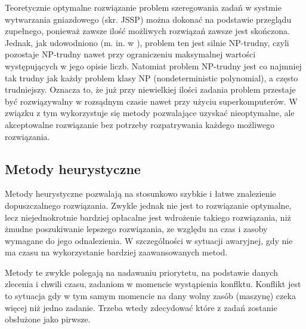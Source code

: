 \documentclass[twoside]{kInzynierka}
\begin{document}
Teoretycznie optymalne rozwiązanie problem szeregowania zadań w systmie wytwarzania gniazdowego (skr. JSSP) można dokonać na podstawie przeglądu zupełnego, ponieważ zawsze ilość możliwych rozwiązań zawsze jest skończona. Jednak, jak udowodniono (m. in. w \cite{np1}\cite{np2}), problem ten jest silnie NP-trudny, czyli pozostaje NP-trudny nawet przy ograniczeniu maksymalnej wartości występujących w jego opisie liczb. Natomiat problem NP-trudny jest co najmniej tak trudny jak każdy problem klasy NP (nondeterministic polynomial), a często trudniejszy. Oznacza to, że już przy niewielkiej ilości zadania problem przestaje być rozwiązywalny w rozsądnym czasie nawet przy użyciu superkomputerów. W związku z tym wykorzystuje się metody pozwalające uzyskać nieoptymalne, ale akceptowalne rozwiązanie bez potrzeby rozpatrywania każdego możliwego rozwiązania. %

\subsection     {Metody heurystyczne}
Metody heurystyczne pozwalają na stosunkowo szybkie i łatwe znalezienie dopuszczalnego rozwiązania. Zwykle jednak nie jest to rozwiązanie optymalne, lecz niejednokrotnie bardziej opłacalne jest wdrożenie takiego rozwiązania, niż żmudne poszukiwanie lepszego rozwiązania, ze względu na czas i zasoby wymagane do jego odnalezienia. W szczególności w sytuacji awaryjnej, gdy nie ma czasu na wykorzystanie bardziej zaawansowanych metod. 

Metody te zwykle polegają na nadawaniu priorytetu, na podstawie danych zlecenia i chwili czasu, zadaniom w momencie wystąpienia konflktu. Konflikt jest to sytuacja gdy w tym samym momencie na dany wolny zasób (maszynę) czeka więcej niż jedno zadanie. Trzeba wtedy zdecydować które z zadań zostanie obsłużone jako pirwsze. 
\end{document}
